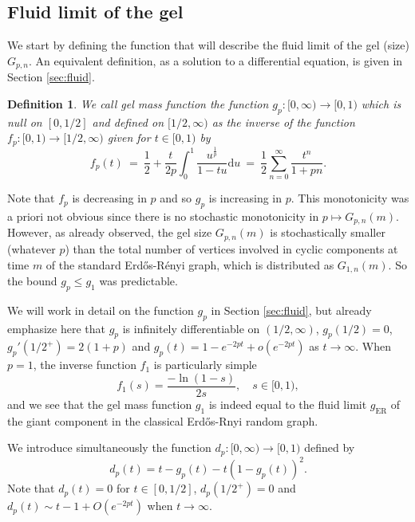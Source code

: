 \documentclass[a4, 11pt]{article}
\numberwithin{equation}{section}
\theoremstyle{plain}
\newtheorem{definition}[theorem]{Definition}
\theoremstyle{definition}
\theoremstyle{remark}
\begin{document}
\subsection{Fluid limit of the gel}

We start by defining the function that will describe the fluid limit of the gel (size) $G_{p,n}$. An equivalent definition, as a solution to a differential equation, is given in Section \ref{sec:fluid}.

\begin{definition}
\label{def:gel_function}
We call \emph{gel mass function} the function $g_p:[0,\infty)\rightarrow [0,1)$ which is null on $[0,1/2]$ and defined on $[1/2,\infty)$ as the \emph{inverse} of the function $f_p:[0,1) \rightarrow [1/2,\infty)$ given for $t \in [0,1)$ by
\begin{equation*}
f_p(t)~=~\frac{1}{2}+\frac{t}{2p}\int_{0}^1 \frac{u^{\frac{1}{p}}}{1-tu} \mathrm du~=~\frac{1}{2}\sum_{n=0}^{\infty}\frac{t^n}{1+pn}.
\end{equation*}
\end{definition}

Note that $f_p$ is decreasing in $p$ and so $g_p$ is increasing in $p$. This monotonicity was a priori not obvious since there is no stochastic monotonicity in $p \mapsto G_{p,n}(m)$. However, as already observed, the gel size $G_{p,n}(m)$ is stochastically smaller (whatever $p$) than the total number of vertices involved in cyclic components at time $m$ of the standard Erd\H{o}s-R\'enyi graph, which is distributed as $G_{1,n}(m)$. So the bound $g_p \leq g_1$ was predictable.


We will work in  detail on the function $g_p$ in Section \ref{sec:fluid}, but already emphasize here that $g_p$ is infinitely differentiable on $(1/2,\infty)$, $g_p(1/2)=0$, $g_p'(1/2^+)=2(1+p)$ and $g_p(t)=1-e^{-2pt}+o\left(e^{-2pt}\right)$ as $t \rightarrow \infty$. When $p=1$, the inverse function $f_1$ is particularly simple
$$f_1(s)=\frac{-\ln(1-s)}{2s},\quad s\in [0,1),$$
and we see that the gel mass function $g_1$ is indeed equal to the fluid limit $g_{\mathrm{ER}}$ of the giant component in the classical Erd\H{o}s-Rnyi random graph. 

We introduce simultaneously the function $d_p:[0,\infty) \rightarrow [0,1)$ defined by 
\begin{equation}
\label{def:d_p}
d_p(t)=t-g_p(t)-t(1-g_p(t))^2.
\end{equation}
Note that $d_p(t)=0$ for $t \in [0,1/2]$, $d_p(1/2^+)=0$ and $d_p(t)\sim t-1+O(e^{-2pt})$ when $t \rightarrow \infty$.
\end{document}
